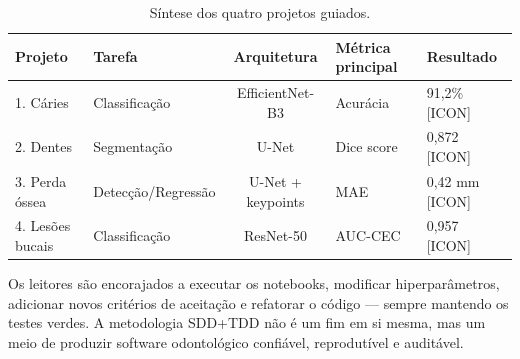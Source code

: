 \begin{table}[H]
  \centering
  \caption{Síntese dos quatro projetos guiados.}
  \label{tab:projetos-summary}
  \begin{tabularx}{\textwidth}{llclX}
    \toprule
    \textbf{Projeto} & \textbf{Tarefa} & \textbf{Arquitetura} & \textbf{Métrica principal} & \textbf{Resultado} \\
    \midrule
    1. Cáries & Classificação & EfficientNet-B3 & Acurácia & 91,2\% [ICON] \\
    2. Dentes & Segmentação & U-Net & Dice score & 0,872 [ICON] \\
    3. Perda óssea & Detecção/Regressão & U-Net + keypoints & MAE & 0,42 mm [ICON] \\
    4. Lesões bucais & Classificação & ResNet-50 & AUC-CEC & 0,957 [ICON] \\
    \bottomrule
  \end{tabularx}
\end{table}

Os leitores são encorajados a executar os notebooks, modificar
hiperparâmetros, adicionar novos critérios de aceitação e refatorar
o código — sempre mantendo os testes verdes. A metodologia SDD+TDD
não é um fim em si mesma, mas um meio de produzir software odontológico
confiável, reprodutível e auditável.

